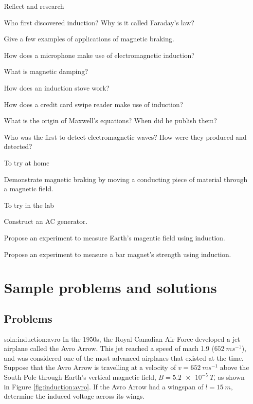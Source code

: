 \begin{chapteractivity}{Reflect and research}
{
\item Who first discovered induction? Why is it called Faraday's law?
\item Give a few examples of applications of magnetic braking.
\item How does a microphone make use of electromagnetic induction?
\item What is magnetic damping?
\item How does an induction stove work?
\item How does a credit card swipe reader make use of induction?
\item What is the origin of Maxwell's equations? When did he publish them?
\item Who was the first to detect electromagnetic waves? How were they produced and detected?
}
\end{chapteractivity}
\begin{chapteractivity}{To try at home}
{
\item Demonstrate magnetic braking by moving a conducting piece of material through a magnetic field.
}
\end{chapteractivity}
\begin{chapteractivity}{To try in the lab}
{
\item Construct an AC generator.
\item Propose an experiment to measure Earth's magentic field using induction.
\item Propose an experiment to measure a bar magnet's strength using induction.
}
\end{chapteractivity}

\newpage
\section{Sample problems and solutions}
\subsection{Problems}
\begin{problem}{soln:induction:avro}{\label{prob:induction:avro} 
In the 1950s, the Royal Canadian Air Force developed a jet airplane called the Avro Arrow. This jet reached a speed of mach 1.9 ($\SI{652}{ms^{-1}}$), and was considered one of the most advanced airplanes that existed at the time. Suppose that the Avro Arrow is travelling at a velocity of $v = \SI{652}{ms^{-1}}$ above the South Pole through Earth's vertical magnetic field, $B = \SI{5.2e-5}{T}$, as shown in Figure \ref{fig:induction:avro}. If the Avro Arrow had a wingspan of $l = \SI{15}{m}$, determine the induced voltage across its wings.
}
\end{problem}


